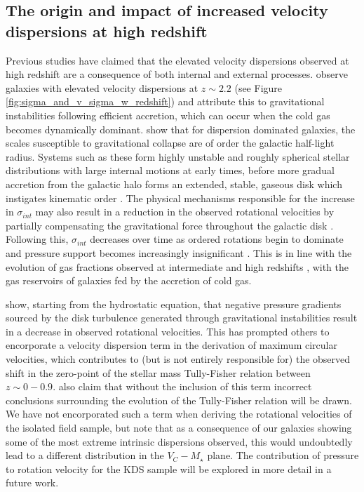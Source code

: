 \documentclass[fleqn,usenatbib]{mn2e}
\begin{document}
\subsection{The origin and impact of increased velocity dispersions at high redshift}\label{discussion_increase_in_sigma}
Previous studies have claimed that the elevated velocity dispersions observed at high redshift are a consequence of both internal and external processes.
\cite{Law2009} observe galaxies with elevated velocity dispersions at $z\sim2.2$ (see Figure \ref{fig:sigma_and_v_sigma_w_redshift}) and attribute this to gravitational instabilities following efficient accretion, which can occur when the cold gas becomes dynamically dominant.
\cite{Genzel2011} show that for dispersion dominated galaxies, the scales susceptible to gravitational collapse are of order the galactic half-light radius. 
Systems such as these form highly unstable and roughly spherical stellar distributions with large internal motions at early times, before more gradual accretion from the galactic halo forms an extended, stable, gaseous disk which instigates kinematic order \citep{Law2009,Genzel2011}.
The physical mechanisms responsible for the increase in $\sigma_{int}$ may also result in a reduction in the observed rotational velocities by partially compensating the gravitational force throughout the galactic disk \citep[e.g.][]{Burkert2010,Wuyts2016b,Ubler2017,Genzel2017,Lang2017}.
Following this, $\sigma_{int}$ decreases over time as ordered rotations begin to dominate and pressure support becomes increasingly insignificant \citep[e.g.][]{Burkert2010,Ubler2017,Genzel2017,Lang2017}.
This is in line with the evolution of gas fractions observed at intermediate and high redshifts \citep[e.g.][]{Saintonge2013,Tacconi2013,Tacconi2017}, with the gas reservoirs of galaxies fed by the accretion of cold gas.

\cite{Burkert2010} show, starting from the hydrostatic equation, that negative pressure gradients sourced by the disk turbulence generated through gravitational instabilities result in a decrease in observed rotational velocities. 
This has prompted others \citep[e.g.][]{Wuyts2016b,Ubler2017,Lang2017} to encorporate a velocity dispersion term in the derivation of maximum circular velocities, which contributes to (but is not entirely responsible for) the observed shift in the zero-point of the stellar mass Tully-Fisher relation between $z\sim0-0.9$.
\cite{Ubler2017} also claim that without the inclusion of this term incorrect conclusions surrounding the evolution of the Tully-Fisher relation will be drawn.
We have not encorporated such a term when deriving the rotational velocities of the isolated field sample, but note that as a consequence of our galaxies showing some of the most extreme intrinsic dispersions observed, this would undoubtedly lead to a different distribution in the $V_{C}-M_{\star}$ plane.
The contribution of pressure to rotation velocity for the KDS sample will be explored in more detail in a future work. 
\\
\end{document}
